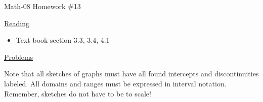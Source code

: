 \documentclass[letterpaper,12pt,fleqn]{article}
\begin{document}
\begin{center}
\Large Math-08 Homework \#13
\end{center}

\vspace{0.5in}

\underline{Reading}

\begin{itemize}
\item Text book section 3.3, 3.4, 4.1
\end{itemize}

\underline{Problems}

Note that all sketches of graphs must have all found intercepts and
discontinuities labeled. All domains and ranges must be expressed in
interval notation. Remember, sketches do not have to be to scale!
\end{document}
